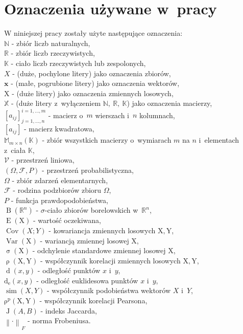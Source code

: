 \documentclass[12pt,a4paper]{report}
\newcommand{\setR}{\mathbb{R}}
\newcommand{\setK}{\mathbb{K}}
\newcommand{\setN}{\mathbb{N}}
\newcommand{\ro}[2]{\operatorname{\rho}\left( {#1},{#2} \right)}
\newcommand{\rop}[2]{\operatorname{\rho^p}\left( {#1},{#2} \right)}
\newcommand{\J}[2]{\operatorname{J}\left({#1}, {#2} \right)}
\newcommand{\similarity}[2]{\operatorname{sim}\left({#1}, {#2} \right)}
\newcommand{\przestrzen}[1]{\operatorname{span}\left({#1} \right)}
\newcommand{\distance}[2]{\operatorname{d}\left({#1}, {#2} \right)}
\newcommand{\distanceee}[2]{\operatorname{d_e}\left({#1}, {#2} \right)}
\newcommand{\Covariance}[2]{\operatorname{Cov}\left({#1}; {#2} \right)}
\newcommand{\norm}[2][]{\left\| {#2} \right\|_{#1}}
\newcommand{\variance}[1]{\operatorname{Var}\left({#1} \right)}
\newcommand{\e}[1]{\operatorname{E}\left({#1} \right)}
\newcommand{\standard}[1]{\operatorname{\sigma}\left({#1} \right)}
\newcommand{\sigmacialo}[1]{\operatorname{B}\left({#1} \right)}
\begin{document}
\section{Oznaczenia używane w~pracy}
W niniejszej pracy zostały użyte następujące oznaczenia:
\\$\setN$ - zbiór liczb naturalnych,
\\$\setR$ - zbiór liczb rzeczywistych,
\\$\setK$ - ciało liczb rzeczywistych lub zespolonych,
\\$\mathit{X}$ - (duże, pochylone litery) jako oznaczenia zbiorów,
\\$\mathbf{x}$ - (małe, pogrubione litery) jako oznaczenia wektorów,
\\$\mathrm{X}$ - (duże litery) jako oznaczenia zmiennych losowych,
\\$\mathbb{X}$ - (duże litery z~wyłączeniem $\setN, \: \setR, \: \setK$) jako oznaczenia macierzy,
\\$[a_{ij}]_{j = 1, \ldots, n}^{i = 1, \ldots , m}$ - macierz o~$m$ wierszach i~$n$ kolumnach,
\\$[a_{ij}]$ - macierz kwadratowa,
\\$\mathbb{M}_{m \times n}(\setK)$ - zbiór wszystkich macierzy o~wymiarach $m$ na $n$ i~elementach z~ciała $\setK$,
\\$\mathcal{V}$ - przestrzeń liniowa,
\\$(\Omega, \mathcal{F}, P)$ - przestrzeń probabilistyczna,
\\$\Omega$ - zbiór zdarzeń elementarnych,
\\$\mathcal{F}$ - rodzina podzbiorów zbioru $\Omega$,
\\$P$ - funkcja prawdopodobieństwa,
\\$\sigmacialo{\setR^n}$ - $\sigma$-ciało zbiorów borelowskich w~$\setR^n$,
\\$\e{\mathrm{X}}$ - wartość oczekiwana,
\\$\Covariance{X}{Y}$ - kowariancja zmiennych losowych $\mathrm{X},\mathrm{Y}$,
\\$\variance{\mathrm{X}}$ - wariancją zmiennej losowej $\mathrm{X}$,
\\$\standard{\mathrm{X}}$ - odchylenie standardowe zmiennej losowej $\mathrm{X}$,
\\$\ro{\mathrm{X}}{\mathrm{Y}}$ - współczynnik korelacji zmiennych losowych $\mathrm{X},\mathrm{Y}$,
\\$\distance{x}{y}$ - odległość punktów $x$ i~$y$,
\\$\distanceee{x}{y}$ - odległość euklidesowa punktów $x$ i~$y$,
\\$\similarity{X}{Y}$ - współczynnik podobieństwa wektorów $X$ i~$Y$,
\\$\rop{\mathrm{X}}{\mathrm{Y}}$ - współczynnik korelacji Pearsona,
\\$\J{\mathit{A}}{\mathit{B}}$ - indeks Jaccarda,
\\ ${\norm{\cdot}}_F$ - norma Frobeniusa.
\end{document}
